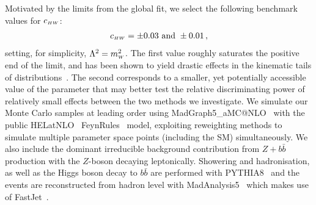 Motivated by the limits from the global fit, we select the following benchmark values for $c_{\scriptscriptstyle HW}$:
\begin{align}
    c_{\scriptscriptstyle HW} = \pm 0.03 \text{ and } \pm0.01\,,
\end{align}
setting, for simplicity, $\Lambda^2=m_{\scriptscriptstyle W}^2$. The first value roughly saturates the positive end of the limit, and has been shown to yield drastic effects in the kinematic tails of distributions~\cite{Degrande:2016dqg}. The second corresponds to a smaller, yet potentially accessible value of the parameter that may better test the relative discriminating power of relatively small effects between the two methods we investigate. We simulate our Monte Carlo samples at leading order using {\sc MadGraph5\_aMC@NLO}~\cite{Alwall:2014hca} with the public {\sc HELatNLO}~\cite{Degrande:2016dqg,Alloul:2013naa} {\sc FeynRules}~\cite{Alloul:2013bka} model, exploiting reweighting methods to simulate multiple parameter space points (including the SM) simultaneously. We also include the dominant irreducible background contribution from $Z + b\bar{b}$ production with the $Z$-boson decaying leptonically. Showering and hadronisation, as well as the Higgs boson decay to $b\bar{b}$ are performed with {\sc PYTHIA8}~\cite{pythia8} and the events are reconstructed from hadron level with {\sc MadAnalysis5}~\cite{Conte:2012fm} which makes use of {\sc FastJet}~\cite{Cacciari:2011ma}.

